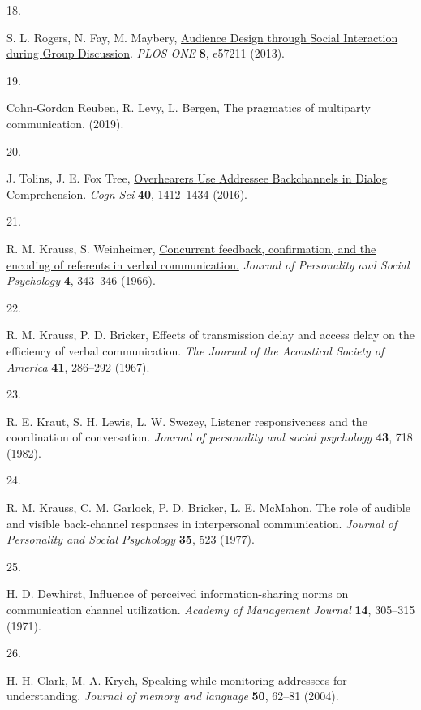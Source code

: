 \documentclass[9pt,twocolumn,twoside]{pnas-new}
\makeatletter
\newlength{\cslhangindent}
\newlength{\csllabelwidth}
\newenvironment{CSLReferences}[2] %
 {\begin{list}{}{%
  \setlength{\itemindent}{0pt}
  \setlength{\leftmargin}{0pt}
  \setlength{\parsep}{0pt}
   \normalfont\sffamily\fontsize{6}{8}\selectfont
    \labelsep2.8pt
   \renewcommand\newblock{\hskip .11em \@plus.33em \@minus.07em}
  \ifodd #1
   \setlength{\leftmargin}{\cslhangindent}
   \setlength{\itemindent}{-1\cslhangindent}
  \fi
  \setlength{\itemsep}{0.0pt}}}
 {\end{list}}
\newcommand{\CSLLeftMargin}[1]{\parbox[t]{\csllabelwidth}{#1}}
\newcommand{\CSLRightInline}[1]{\parbox[t]{\linewidth - \csllabelwidth}{#1}\break}
\makeatother
\begin{document}
\begin{CSLReferences}{0}{1}
	\CSLLeftMargin{18. }%
	\CSLRightInline{S. L. Rogers, N. Fay, M. Maybery,
		\href{https://doi.org/10.1371/journal.pone.0057211}{Audience {Design}
			through {Social Interaction} during {Group Discussion}}. \emph{PLOS ONE}
		\textbf{8}, e57211 (2013).}
	
	\CSLLeftMargin{19. }%
	\CSLRightInline{Cohn-Gordon Reuben, R. Levy, L. Bergen, The pragmatics
		of multiparty communication. (2019).}
	
	\CSLLeftMargin{20. }%
	\CSLRightInline{J. Tolins, J. E. Fox Tree,
		\href{https://doi.org/10.1111/cogs.12278}{Overhearers {Use Addressee
				Backchannels} in {Dialog Comprehension}}. \emph{Cogn Sci} \textbf{40},
		1412--1434 (2016).}
	
	\CSLLeftMargin{21. }%
	\CSLRightInline{R. M. Krauss, S. Weinheimer,
		\href{https://doi.org/10.1037/h0023705}{Concurrent feedback,
			confirmation, and the encoding of referents in verbal communication.}
		\emph{Journal of Personality and Social Psychology} \textbf{4}, 343--346
		(1966).}
	
	\CSLLeftMargin{22. }%
	\CSLRightInline{R. M. Krauss, P. D. Bricker, Effects of transmission
		delay and access delay on the efficiency of verbal communication.
		\emph{The Journal of the Acoustical Society of America} \textbf{41},
		286--292 (1967).}
	
	\CSLLeftMargin{23. }%
	\CSLRightInline{R. E. Kraut, S. H. Lewis, L. W. Swezey, Listener
		responsiveness and the coordination of conversation. \emph{Journal of
			personality and social psychology} \textbf{43}, 718 (1982).}
	
	\CSLLeftMargin{24. }%
	\CSLRightInline{R. M. Krauss, C. M. Garlock, P. D. Bricker, L. E.
		McMahon, The role of audible and visible back-channel responses in
		interpersonal communication. \emph{Journal of Personality and Social
			Psychology} \textbf{35}, 523 (1977).}
	
	\CSLLeftMargin{25. }%
	\CSLRightInline{H. D. Dewhirst, Influence of perceived
		information-sharing norms on communication channel utilization.
		\emph{Academy of Management Journal} \textbf{14}, 305--315 (1971).}
	
	\CSLLeftMargin{26. }%
	\CSLRightInline{H. H. Clark, M. A. Krych, Speaking while monitoring
		addressees for understanding. \emph{Journal of memory and language}
		\textbf{50}, 62--81 (2004).}
	

\end{CSLReferences}
\end{document}
